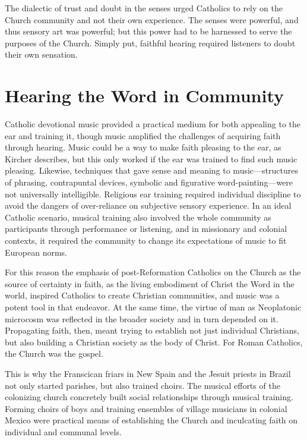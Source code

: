The dialectic of trust and doubt in the senses urged Catholics to rely on the Church community and not their own experience.
The senses were powerful, and thus sensory art was powerful; but this power had to be harnessed to serve the purposes of the Church.
Simply put, faithful hearing required listeners to doubt their own sensation.



\section{Hearing the Word in Community}

Catholic devotional music provided a practical medium for both appealing to the ear and training it, though music amplified the challenges of acquiring faith through hearing.
Music could be a way to make faith pleasing to the ear, as Kircher  describes, but this only worked if the ear was trained to find such music pleasing.
Likewise, techniques that gave sense and meaning to music---structures of phrasing, contrapuntal devices, symbolic and figurative word-painting---were not universally intelligible.
Religious ear training required individual discipline to avoid the dangers of over-reliance on subjective sensory experience.
In an ideal Catholic scenario, musical training also involved the whole community as participants through performance or listening, and in missionary and colonial contexts, it required the community to change its expectations of music to fit European norms.

For this reason the emphasis of post-Reformation Catholics on the Church as the source of certainty in faith, as the living embodiment of Christ the Word in the world, inspired Catholics to create Christian communities, and music was a potent tool in that endeavor.
At the same time, the virtue of man as Neoplatonic microcosm was reflected in the broader society and in turn depended on it.
Propagating faith, then, meant trying to establish not just individual Christians, but also building a Christian society as the body of Christ.
For Roman Catholics, the Church was the gospel.

This is why the Franscican friars in New Spain and the Jesuit priests in Brazil not only started parishes, but also trained choirs.
The musical efforts of the colonizing church concretely built social relationships through musical training.
Forming choirs of boys and training ensembles of village musicians in colonial Mexico were practical means of establishing the Church and inculcating faith on individual and communal levels.

